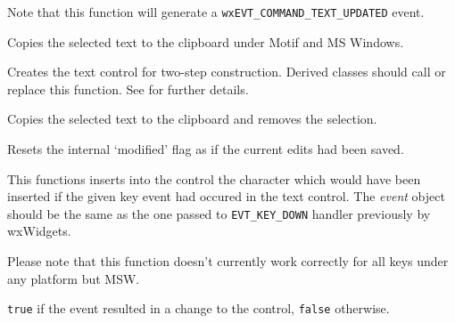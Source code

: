 Note that this function will generate a {\tt wxEVT\_COMMAND\_TEXT\_UPDATED}
event.


\label{wxtextctrlcopy}


Copies the selected text to the clipboard under Motif and MS Windows.


\label{wxtextctrlcreate}


Creates the text control for two-step construction. Derived classes
should call or replace this function. See \rtfsp
for further details.


\label{wxtextctrlcut}


Copies the selected text to the clipboard and removes the selection.




Resets the internal `modified' flag as if the current edits had been saved.




This functions inserts into the control the character which would have been
inserted if the given key event had occured in the text control. The 
{\it event} object should be the same as the one passed to {\tt EVT\_KEY\_DOWN}
handler previously by wxWidgets.

Please note that this function doesn't currently work correctly for all keys
under any platform but MSW.


{\tt true} if the event resulted in a change to the control, {\tt false}
otherwise.


\label{wxtextctrlgetdefaultstyle}

